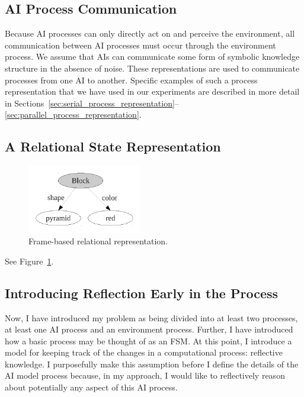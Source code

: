 \subsection{AI Process Communication}

Because AI processes can only directly act on and perceive the
environment, all communication between AI processes must occur
through the environment process.  We assume that AIs can
communicate some form of symbolic knowledge structure in the absence
of noise.  These representations are used to communicate processes
from one AI to another.  Specific examples of such a process
representation that we have used in our experiments are described in
more detail in
Sections~\ref{sec:serial_process_representation}--\ref{sec:parallel_process_representation}.


\subsection{A Relational State Representation}

\begin{figure}[bth]
  \center
  \includegraphics[height=3cm]{gfx/frame_representation}
  \caption[Frame-based relational representation]{Frame-based relational representation.}
  \label{fig:frame_representation}
\end{figure}

See Figure~\ref{fig:frame_representation}.

\subsection{Introducing Reflection Early in the Process}
\label{sec:introducing_reflection_early_in_the_process}

Now, I have introduced my problem as being divided into at least two
processes, at least one AI process and an environment process.
Further, I have introduced how a basic process may be thought of as an
\ac{FSM}.  At this point, I introduce a model for keeping track of the
changes in a computational process: reflective knowledge.  I
purposefully make this assumption before I define the details of the
AI model process because, in my approach, I would like to
reflectively reason about potentially any aspect of this AI
process.



